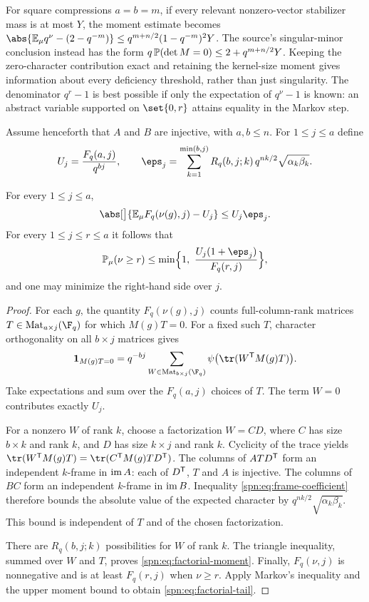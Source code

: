 For square compressions $a=b=m$, if every relevant nonzero-vector stabilizer
mass is at most $Y$, the moment estimate becomes
$\abs{\spnE_\mu q^\nu-(2-q^{-m})}\le q^{m+n/2}(1-q^{-m})^2Y$. The source's
singular-minor conclusion instead has the form
$q\,\mathbb{P}(\det M=0)\le2+q^{m+n/2}Y$. Keeping the zero-character contribution
exact and retaining the kernel-size moment gives information about every
deficiency threshold, rather than just singularity. The denominator $q^r-1$
is best possible if only the expectation of $q^\nu-1$ is known: an abstract
variable supported on $\set{0,r}$ attains equality in the Markov step.

Assume henceforth that $A$ and $B$ are injective, with $a,b\le n$. For
$1\le j\le a$ define
\begin{equation}\label{spn:eq:moment-main}
 U_j=\frac{F_q(a,j)}{q^{bj}},\qquad
 \eps_j=\sum_{k=1}^{\min(b,j)}R_q(b,j;k)\,q^{nk/2}\sqrt{\alpha_k\beta_k} .
\end{equation}

\begin{theorem}\label{spn:thm:factorial-kernel}
For every $1\le j\le a$,
\begin{equation}\label{spn:eq:factorial-moment}
 \abs[\big]{\spnE_\mu F_q(\nu(g),j)-U_j}\le U_j\eps_j .
\end{equation}
For every $1\le j\le r\le a$ it follows that
\begin{equation}\label{spn:eq:factorial-tail}
 \spnP_\mu(\nu\ge r)\le\min\Bigl\{1,\ \frac{U_j(1+\eps_j)}{F_q(r,j)}\Bigr\},
\end{equation}
and one may minimize the right-hand side over $j$.
\end{theorem}

\begin{proof}
For each $g$, the quantity $F_q(\nu(g),j)$ counts full-column-rank matrices
$T\in\spnMat_{a\times j}(\F_q)$ for which $M(g)T=0$. For a fixed such $T$,
character orthogonality on all $b\times j$ matrices gives
\[
 \mathbf 1_{M(g)T=0}=q^{-bj}\sum_{W\in\spnMat_{b\times j}(\F_q)}
 \psi\bigl(\tr(W^{\spnT}M(g)T)\bigr).
\]
Take expectations and sum over the $F_q(a,j)$ choices of $T$. The term $W=0$
contributes exactly $U_j$.

For a nonzero $W$ of rank $k$, choose a factorization $W=CD$, where $C$ has
size $b\times k$ and rank $k$, and $D$ has size $k\times j$ and rank $k$.
Cyclicity of the trace yields
$\tr(W^{\spnT}M(g)T)=\tr(C^{\spnT}M(g)TD^{\spnT})$. The columns of
$ATD^{\mathsf{T}}$ form an independent $k$-frame in $\operatorname{im} A$: each of
$D^{\mathsf{T}}$, $T$ and $A$ is injective. The columns of $BC$ form an
independent $k$-frame in $\operatorname{im} B$. Inequality
\eqref{spn:eq:frame-coefficient} therefore bounds the absolute value of the
expected character by $q^{nk/2}\sqrt{\alpha_k\beta_k}$. This bound is
independent of $T$ and of the chosen factorization.

There are $R_q(b,j;k)$ possibilities for $W$ of rank $k$. The triangle
inequality, summed over $W$ and $T$, proves \eqref{spn:eq:factorial-moment}.
Finally, $F_q(\nu,j)$ is nonnegative and is at least $F_q(r,j)$ when
$\nu\ge r$. Apply Markov's inequality and the upper moment bound to obtain
\eqref{spn:eq:factorial-tail}.
\end{proof}

